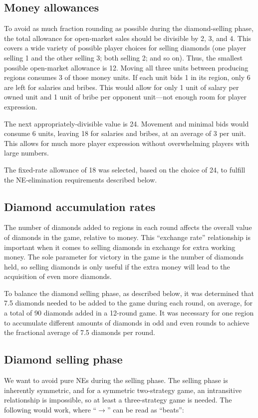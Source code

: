 \subsection{Money allowances}
To avoid as much fraction rounding as possible during the diamond-selling phase, the total allowance for open-market sales should be divisible by 2, 3, and 4.  This covers a wide variety of possible player choices for selling diamonds (one player selling 1 and the other selling 3; both selling 2; and so on).  Thus, the smallest possible open-market allowance is 12.  Moving all three units between producing regions consumes 3 of those money units.  If each unit bids 1 in its region, only 6 are left for salaries and bribes.  This would allow for only 1 unit of salary per owned unit and 1 unit of bribe per opponent unit---not enough room for player expression.

The next appropriately-divisible value is 24.  Movement and minimal bids would consume 6 units, leaving 18 for salaries and bribes, at an average of 3 per unit.  This allows for much more player expression without overwhelming players with large numbers.

The fixed-rate allowance of 18 was selected, based on the choice of 24, to fulfill the NE-elimination requirements described below.


\subsection{Diamond accumulation rates}
The number of diamonds added to regions in each round affects the overall value of diamonds in the game, relative to money.  This ``exchange rate'' relationship is important when it comes to selling diamonds in exchange for extra working money.  The sole parameter for victory in the game is the number of diamonds held, so selling diamonds is only useful if the extra money will lead to the acquisition of even more diamonds.

To balance the diamond selling phase, as described below, it was determined that 7.5 diamonds needed to be added to the game during each round, on average, for a total of 90 diamonds added in a 12-round game.  It was necessary for one region to accumulate different amounts of diamonds in odd and even rounds to achieve the fractional average of 7.5 diamonds per round.


\subsection{Diamond selling phase}
We want to avoid pure NEs during the selling phase.  The selling phase is inherently symmetric, and for a symmetric two-strategy game, an intransitive relationship is impossible, so at least a three-strategy game is needed.  The following would work, where ``$\longrightarrow$'' can be read as ``beats'':

